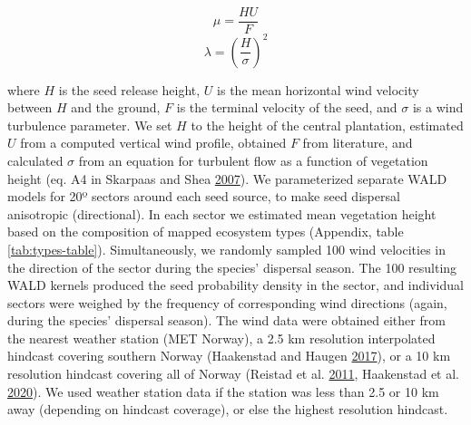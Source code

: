 \documentclass[
]{article}
\begin{document}
\begin{equation}
\mu  = \frac{HU}{F}
\end{equation}
\begin{equation}
\lambda = \left(\frac{H}{\sigma}\right)^2
\end{equation}

where \(H\) is the seed release height, \(U\) is the mean horizontal wind velocity between \(H\) and the ground, \(F\) is the terminal velocity of the seed, and \(\sigma\) is a wind turbulence parameter.
We set \(H\) to the height of the central plantation, estimated \(U\) from a computed vertical wind profile, obtained \(F\) from literature, and calculated \(\sigma\) from an equation for turbulent flow as a function of vegetation height (eq. A4 in Skarpaas and Shea \protect\hyperlink{ref-skarpaasDispersalPatternsDispersal2007}{2007}).
We parameterized separate WALD models for 20º sectors around each seed source, to make seed dispersal anisotropic (directional).
In each sector we estimated mean vegetation height based on the composition of mapped ecosystem types (Appendix, table \ref{tab:types-table}).
Simultaneously, we randomly sampled 100 wind velocities in the direction of the sector during the species' dispersal season.
The 100 resulting WALD kernels produced the seed probability density in the sector, and individual sectors were weighed by the frequency of corresponding wind directions (again, during the species' dispersal season).
The wind data were obtained either from the nearest weather station (MET Norway), a 2.5 km resolution interpolated hindcast covering southern Norway (Haakenstad and Haugen \protect\hyperlink{ref-haakenstad15yearHighResolution2017}{2017}), or a 10 km resolution hindcast covering all of Norway (Reistad et al. \protect\hyperlink{ref-reistadHighresolutionHindcastWind2011}{2011}, Haakenstad et al. \protect\hyperlink{ref-haakenstadNORA10EIRevisedRegional2020}{2020}). We used weather station data if the station was less than 2.5 or 10 km away (depending on hindcast coverage), or else the highest resolution hindcast.
\end{document}
